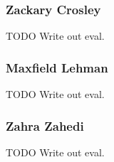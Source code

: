 \documentclass{article}
\begin{document}
\subsubsection*{Zackary Crosley}
TODO Write out eval.
\subsubsection*{Maxfield Lehman}
TODO Write out eval.
\subsubsection*{Zahra Zahedi}
TODO Write out eval.



\end{document}
